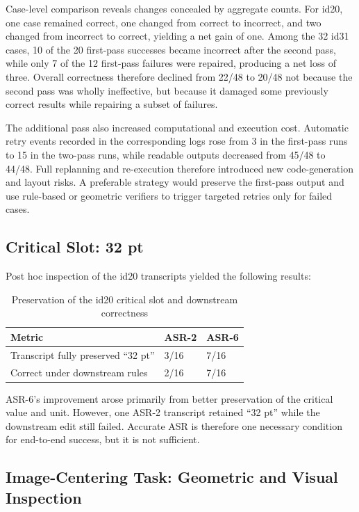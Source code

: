 \documentclass[11pt,a4paper,UTF8,fontset=fandol]{ctexart}
\begin{document}
Case-level comparison reveals changes concealed by aggregate counts. For id20, one case remained correct, one changed from correct to incorrect, and two changed from incorrect to correct, yielding a net gain of one. Among the 32 id31 cases, 10 of the 20 first-pass successes became incorrect after the second pass, while only 7 of the 12 first-pass failures were repaired, producing a net loss of three. Overall correctness therefore declined from 22/48 to 20/48 not because the second pass was wholly ineffective, but because it damaged some previously correct results while repairing a subset of failures.

The additional pass also increased computational and execution cost. Automatic retry events recorded in the corresponding logs rose from 3 in the first-pass runs to 15 in the two-pass runs, while readable outputs decreased from 45/48 to 44/48. Full replanning and re-execution therefore introduced new code-generation and layout risks. A preferable strategy would preserve the first-pass output and use rule-based or geometric verifiers to trigger targeted retries only for failed cases.

\subsection{Critical Slot: 32 pt}

Post hoc inspection of the id20 transcripts yielded the following results:

\begin{table}[H]
\centering
\caption{Preservation of the id20 critical slot and downstream correctness}
\small
\begin{tabularx}{0.78\textwidth}{Y C{3.2cm} C{3.2cm}}
\toprule
Metric & ASR-2 & ASR-6 \\
\midrule
Transcript fully preserved ``32 pt'' & 3/16 & 7/16 \\
Correct under downstream rules & 2/16 & 7/16 \\
\bottomrule
\end{tabularx}
\end{table}

ASR-6's improvement arose primarily from better preservation of the critical value and unit. However, one ASR-2 transcript retained ``32 pt'' while the downstream edit still failed. Accurate ASR is therefore one necessary condition for end-to-end success, but it is not sufficient.

\subsection{Image-Centering Task: Geometric and Visual Inspection}
\end{document}

